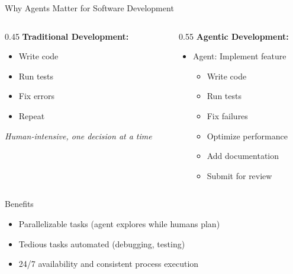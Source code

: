\documentclass[aspectratio=169, 11pt]{beamer}
\begin{document}
\begin{frame}{Why Agents Matter for Software Development}
    \begin{columns}[T]
        \begin{column}{0.45\textwidth}
            \textbf{Traditional Development:}
            \begin{itemize}
                \item Write code
                \item Run tests
                \item Fix errors
                \item Repeat
            \end{itemize}
            \textit{Human-intensive, one decision at a time}
        \end{column}
        \begin{column}{0.55\textwidth}
            \textbf{Agentic Development:}
            \begin{itemize}
                \item Agent: Implement feature
                \begin{itemize}
                    \item Write code
                    \item Run tests
                    \item Fix failures
                    \item Optimize performance
                    \item Add documentation
                    \item Submit for review
                \end{itemize}
            \end{itemize}
        \end{column}
    \end{columns}

    \vspace{0.5cm}
    \begin{block}{Benefits}
        \begin{itemize}
            \item Parallelizable tasks (agent explores while humans plan)
            \item Tedious tasks automated (debugging, testing)
            \item 24/7 availability and consistent process execution
        \end{itemize}
    \end{block}

\end{frame}
\end{document}

